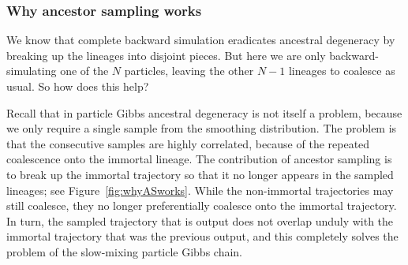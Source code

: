 \subsubsection{Why ancestor sampling works}
We know that complete backward simulation eradicates ancestral degeneracy by breaking up the lineages into disjoint pieces.
But here we are only backward-simulating one of the $N$ particles, leaving the other $N-1$ lineages to coalesce as usual. So how does this help?

Recall that in particle Gibbs ancestral degeneracy is not itself a problem, because we only require a single sample from the smoothing distribution. 
The problem is that the consecutive samples are highly correlated, because of  the repeated coalescence onto the immortal lineage.
The contribution of ancestor sampling is to break up the immortal trajectory so that it no longer appears in the sampled lineages; see Figure~\ref{fig:whyASworks}. While the non-immortal trajectories may still coalesce, they no longer preferentially coalesce onto the immortal trajectory. 
In turn, the sampled trajectory that is output does not overlap unduly with the immortal trajectory that was the previous output, and this completely solves the problem of the slow-mixing particle Gibbs chain.
%
